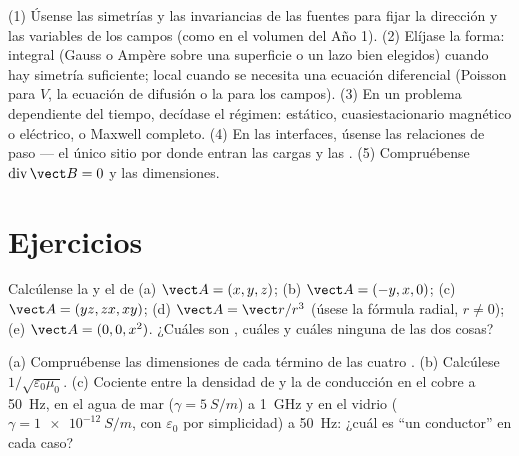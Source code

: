 \begin{method}\label{met:b2:maxwell-equations:method}
(1) Úsense las simetrías y las invariancias de las fuentes para fijar la
dirección y las variables de los campos (como en el volumen del Año 1).
(2) Elíjase la forma: integral (Gauss o Ampère sobre una superficie o un
lazo bien elegidos) cuando hay simetría suficiente; local cuando se
necesita una ecuación diferencial (Poisson para $V$, la ecuación de
difusión o la  para los campos). (3) En un problema
dependiente del tiempo, decídase el régimen: estático, cuasiestacionario
magnético o eléctrico, o Maxwell completo. (4) En las interfaces, úsense
las relaciones de paso --- el único sitio por donde entran las cargas y
las . (5) Compruébense
$\operatorname{div}\vect B = 0$ y las dimensiones.
\end{method}

\section{Ejercicios}

\begin{exercise}[$\star$]\label{exo:b2:maxwell-equations:1}
Calcúlense la  y el  de (a) $\vect A = (x, y, z)$; (b)
$\vect A = (-y, x, 0)$; (c) $\vect A = (yz, zx, xy)$; (d) $\vect A = \vect r/r^3$
(úsese la fórmula radial, $r \ne 0$); (e) $\vect A = (0, 0, x^2)$. ¿Cuáles son
, cuáles  y cuáles ninguna de las dos cosas?
\end{exercise}

\begin{exercise}[$\star$]\label{exo:b2:maxwell-equations:2}
(a) Compruébense las dimensiones de cada término de las cuatro . (b) Calcúlese $1/\sqrt{\varepsilon_0\mu_0}$. (c) Cociente entre la
densidad de  y la  de conducción en el cobre a \qty{50}{Hz}, en
el agua de mar ($\gamma = \qty{5}{S/m}$) a \qty{1}{GHz} y en el vidrio ($\gamma =
\qty{1e-12}{S/m}$, con $\varepsilon_0$ por simplicidad) a \qty{50}{Hz}: ¿cuál es
``un conductor'' en cada caso?
\end{exercise}

